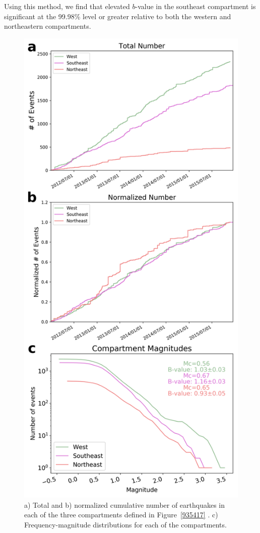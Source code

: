 Using this method, we find that elevated $b$-value in the southeast compartment is significant at the 99.98\% level or greater relative to both the western and northeastern compartments.

\begin{figure}[p]
\begin{center}
\includegraphics[width=0.67\columnwidth]{Chapter_4_Rot/figures/Rot_bval_compartments/Rot_dets_compartments_w_mags_max-like_labels}
\caption[Compartment characteristics of seismicity]{{
a) Total and b) normalized cumulative number of earthquakes in each of
the three compartments defined in Figure~{\ref{935417}}
. c) Frequency-magnitude distributions for each of the compartments.
{\label{599295}}%
}}
\end{center}
\end{figure}

